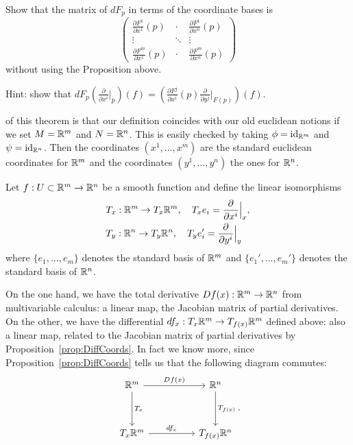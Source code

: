 \begin{exe}
    Show that the matrix of $d F_p$ in terms of the coordinate bases is 
    \begin{equation}
        \begin{pmatrix}
            \frac{\partial F^1}{\partial x^1} (p) & \cdot & \frac{\partial F^1}{\partial x^n} (p) \\
            \vdots & \ddots & \vdots \\
            \frac{\partial F^m}{\partial x^1} (p) & \cdot & \frac{\partial F^m}{\partial x^n} (p)
        \end{pmatrix}
    \end{equation}
    without using the Proposition above.

    \noindent Hint: show that $d F_p \left(\frac{\partial}{\partial x^i}\big|_p\right) (f) = \left(\frac{\partial F^j}{\partial x^i} (p) \frac{\partial}{\partial y^j}\big|_{F(p)}\right) (f)$.
\end{exe}

 of this theorem is that our definition coincides with our old euclidean notions if we set $M=\mathbb{R}^m$ and $N=\mathbb{R}^n$.
This is easily checked by taking $\phi = \operatorname{id}_{\mathbb{R}^m}$ and $\psi=\operatorname{id}_{\mathbb{R}^n}$.
Then the coordinates $(x^1,\ldots,x^m)$ are the standard euclidean coordinates for $\mathbb{R}^m$ and the coordinates $(y^1,\ldots,y^n)$ the ones for $\mathbb{R}^n$.

Let $f:U\subset\mathbb{R}^m\to\mathbb{R}^n$ be a smooth function and define the linear isomorphisms
\begin{align}\label{def:lin_iso_Tp}
    &T_x : \mathbb{R}^m \to T_x\mathbb{R}^m,\quad T_x e_i = \frac{\partial}{\partial x^i}\Big|_x,\\
    &T_y : \mathbb{R}^n \to T_y\mathbb{R}^n,\quad T_y e_i' = \frac{\partial}{\partial y^i}\Big|_y
\end{align}
where $\{e_1,\ldots,e_m\}$ denotes the standard basis of $\mathbb{R}^m$ and $\{e_1',\ldots,e_m'\}$ denotes the standard basis of $\mathbb{R}^n$.

On the one hand, we have the total derivative $Df(x):\mathbb{R}^m\to\mathbb{R}^n$ from multivariable calculus: a linear map, the Jacobian matrix of partial derivatives.
On the other, we have the differential $df_x : T_x \mathbb{R}^m \to T_{f(x)}\mathbb{R}^m$ defined above: also a linear map, related to the Jacobian matrix of partial derivatives by Proposition~\ref{prop:DiffCoords}.
In fact we know more, since Proposition~\ref{prop:DiffCoords} tells us that the following diagram commutes:
\begin{equation}
    \begin{tikzcd}[row sep=huge, column sep=huge]
        \R^m \arrow[r, "Df(x)"] \arrow[d, "T_x"]
        & \R^n \arrow[d, "T_{f(x)}"] \\
        T_x\R^m \arrow[r, "df_x"]
        & T_{f(x)}\R^n
    \end{tikzcd}.
\end{equation}

